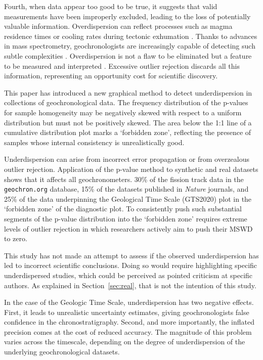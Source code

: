 \documentclass[gchron, manuscript]{copernicus}
\begin{document}
Fourth, when data appear too good to be true, it suggests that valid
measurements have been improperly excluded, leading to the loss of
potentially valuable information. Overdispersion can reflect processes
such as magma residence times \citep{rioux2012} or cooling rates
during tectonic exhumation \citep{galbraith1993}. Thanks to advances
in mass spectrometry, geochronologists are increasingly capable of
detecting such subtle complexities
\citep{phillips2013}. Overdispersion is not a flaw to be eliminated
but a feature to be measured and interpreted
\citep{kalsbeek1992,vermeesch2025c}. Excessive outlier rejection
discards all this information, representing an opportunity cost for
scientific discovery.

\conclusions\label{sec:conclusions}

This paper has introduced a new graphical method to detect
underdispersion in collections of geochronological data.  The
frequency distribution of the p-values for sample homogeneity may be
negatively skewed with respect to a uniform distribution but must not
be positively skewed. The area below the 1:1 line of a cumulative
distribution plot marks a `forbidden zone', reflecting the presence of
samples whose internal consistency is unrealistically good.\medskip

Underdispersion can arise from incorrect error propagation or from
overzealous outlier rejection. Application of the p-value method to
synthetic and real datasets shows that it affects all geochronometers.
30\% of the fission track data in the \texttt{geochron.org} database,
15\% of the datasets published in \emph{Nature} journals, and 25\% of
the data underpinning the Geological Time Scale (GTS2020) plot in the
`forbidden zone' of the diagnostic plot.  To consistently push such
substantial segments of the p-value distribution into the `forbidden
zone' requires extreme levels of outlier rejection in which
researchers actively aim to push their MSWD to zero.\medskip

This study has not made an attempt to assess if the observed
underdispersion has led to incorrect scientific conclusions. Doing so
would require highlighting specific underdispersed studies, which
could be perceived as pointed criticism at specific authors.  As
explained in Section~\ref{sec:real}, that is not the intention of this
study.\medskip

In the case of the Geologic Time Scale, underdispersion has two
negative effects. First, it leads to unrealistic uncertainty
estimates, giving geochronologists false confidence in the
chronostratigraphy.  Second, and more importantly, the inflated
precision comes at the cost of reduced accuracy. The magnitude of this
problem varies across the timescale, depending on the degree of
underdispersion of the underlying geochronological datasets.\medskip
\end{document}
